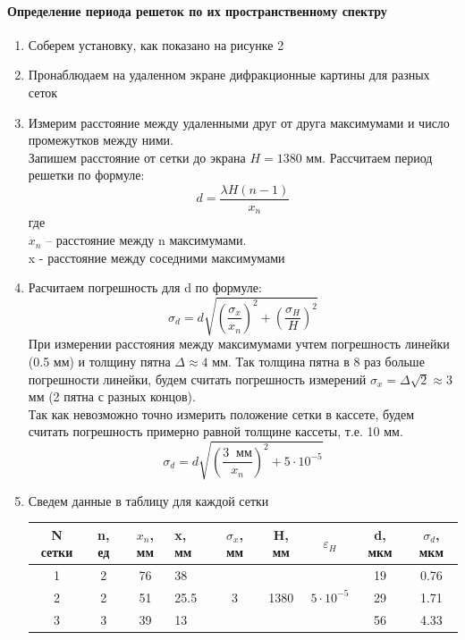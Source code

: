 \documentclass[a4paper,12pt]{article}
\begin{document}
\paragraph{Определение периода решеток по их пространственному спектру}
\begin{enumerate}
\itemsep0em
\item Соберем установку, как показано на рисунке 2
\item  Пронаблюдаем на удаленном экране дифракционные картины для разных сеток
\item Измерим расстояние между удаленными друг от друга максимумами и число промежутков между ними.\\
Запишем расстояние от сетки до экрана $H = 1380$ мм. Рассчитаем период решетки по формуле:
\[ d = \frac{\lambda H(n-1)}{x_{n}}\]
где\\ $x_{n}$ -- расстояние между n максимумами.\\
x - расстояние между соседними максимумами
\item Расчитаем погрешность  для d по формуле:
\[\sigma_{d} = d\sqrt{\left(\frac{\sigma_{x} }{x_{n}}\right)^2+ \left(\frac{\sigma_{H}}{H}\right)^2} \]
При измерении расстояния между максимумами учтем погрешность линейки (0.5 мм) и толщину пятна $\Delta \approx 4$ мм. Так толщина пятна в 8 раз больше погрешности линейки, будем считать погрешность измерений $\sigma_{x} = \Delta\sqrt{2}\approx 3$ мм (2 пятна с разных концов).\\
Так как невозможно точно измерить положение сетки в кассете, будем считать погрешность примерно равной толщине кассеты, т.е. 10 мм.
\[\sigma_{d} = d\sqrt{\left(\frac{3\;\;\text{мм}}{x_{n}}\right)^2 + 5\cdot 10^{-5}}\]
\item Сведем данные в таблицу для каждой сетки 
\begin{table}[h!]
\centering
\begin{tabular}{|c|c|c|l|c|c|c|c|c|}
\hline
N сетки & n, ед & $x_{n}$, мм & x, мм & $\sigma_{x}$, мм   & H, мм                 & $\varepsilon_{H}$                 & d, мкм & $\sigma_d$, мкм \\ \hline
1       & 2     & 76          & 38    & \multirow{5}{*}{3} & \multirow{5}{*}{1380} & \multirow{5}{*}{$5\cdot 10^{-5}$} & 19     & 0.76            \\ \cline{1-4} \cline{8-9} 
2       & 2     & 51          & 25.5  &                    &                       &                                   & 29     & 1.71            \\ \cline{1-4} \cline{8-9} 
3       & 3     & 39          & 13    &                    &                       &                                   & 56     & 4.33            \\ \cline{1-4} \cline{8-9} 

\end{tabular}
\end{table}
\end{enumerate}
\end{document}
